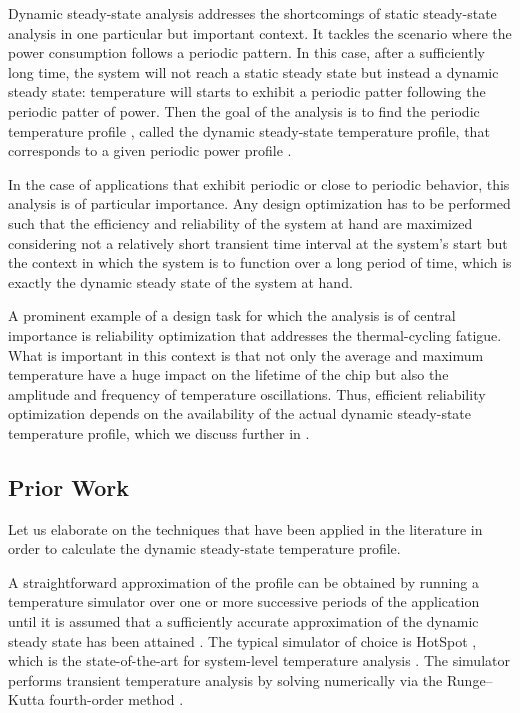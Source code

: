 Dynamic steady-state analysis addresses the shortcomings of static steady-state
analysis in one particular but important context. It tackles the scenario where
the power consumption follows a periodic pattern. In this case, after a
sufficiently long time, the system will not reach a static steady state but
instead a dynamic steady state: temperature will starts to exhibit a periodic
patter following the periodic patter of power. Then the goal of the analysis is
to find the periodic temperature profile \mq, called the dynamic steady-state
temperature profile, that corresponds to a given periodic power profile \mp.

In the case of applications that exhibit periodic or close to periodic behavior,
this analysis is of particular importance. Any design optimization has to be
performed such that the efficiency and reliability of the system at hand are
maximized considering not a relatively short transient time interval at the
system's start but the context in which the system is to function over a long
period of time, which is exactly the dynamic steady state of the system at hand.

A prominent example of a design task for which the analysis is of central
importance is reliability optimization that addresses the thermal-cycling
fatigue. What is important in this context is that not only the average and
maximum temperature have a huge impact on the lifetime of the chip but also the
amplitude and frequency of temperature oscillations. Thus, efficient reliability
optimization depends on the availability of the actual dynamic steady-state
temperature profile, which we discuss further in
.

\subsection{Prior Work}

Let us elaborate on the techniques that have been applied in the literature in
order to calculate the dynamic steady-state temperature profile.

A straightforward approximation of the profile can be obtained by running a
temperature simulator over one or more successive periods of the application
until it is assumed that a sufficiently accurate approximation of the dynamic
steady state has been attained \cite{srinivasan2004}. The typical simulator of
choice is HotSpot \cite{skadron2003}, which is the state-of-the-art for
system-level temperature analysis \cite{srinivasan2004, liao2005, coskun2006,
liu2007, huang2009b, xiang2010, thiele2011}. The simulator performs transient
temperature analysis by solving  numerically
via the Runge--Kutta fourth-order method \cite{press2007}.

